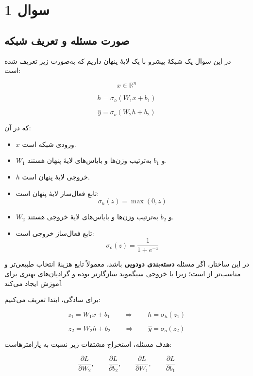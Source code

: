 \documentclass[12pt,a4paper]{article}
\begin{document}
	
\section{سوال 1}

\subsection{صورت مسئله و تعریف شبکه}

در این سوال یک شبکهٔ پیشرو  با یک لایهٔ پنهان داریم که به‌صورت زیر تعریف شده است:

\[
x \in \mathbb{R}^n
\]

\[
h = \sigma_h(W_1x+b_1)
\]

\[
\hat{y} = \sigma_o(W_2h+b_2)
\]

که در آن:

\begin{itemize}
	\item $x$ ورودی شبکه است.
	\item $W_1$ و $b_1$ به‌ترتیب وزن‌ها و بایاس‌های لایهٔ پنهان هستند.
	\item $h$ خروجی لایهٔ پنهان است.
	\item تابع فعال‌ساز لایهٔ پنهان  است:
	\[
	\sigma_h(z)=\max(0,z)
	\]
	\item $W_2$ و $b_2$ به‌ترتیب وزن‌ها و بایاس‌های لایهٔ خروجی هستند.
	\item تابع فعال‌ساز خروجی  است:
	\[
	\sigma_o(z)=\frac{1}{1+e^{-z}}
	\]
\end{itemize}

\begin{tcolorbox}[colback=lightblue,colframe=mainblue,title=نکته مهم]
	در این ساختار، اگر مسئله \textbf{دسته‌بندی دودویی} باشد، معمولاً تابع هزینهٔ  انتخاب طبیعی‌تر و مناسب‌تر از  است؛ زیرا با خروجی سیگموید سازگارتر بوده و گرادیان‌های بهتری برای آموزش ایجاد می‌کند.
\end{tcolorbox}

\vspace{0.3cm}

برای سادگی، ابتدا تعریف می‌کنیم:

\[
z_1 = W_1x+b_1
\qquad\Longrightarrow\qquad
h=\sigma_h(z_1)
\]

\[
z_2 = W_2h+b_2
\qquad\Longrightarrow\qquad
\hat{y}=\sigma_o(z_2)
\]

هدف مسئله، استخراج مشتقات زیر نسبت به پارامترهاست:

\[
\frac{\partial L}{\partial W_2},\qquad
\frac{\partial L}{\partial b_2},\qquad
\frac{\partial L}{\partial W_1},\qquad
\frac{\partial L}{\partial b_1}
\]
\end{document}
